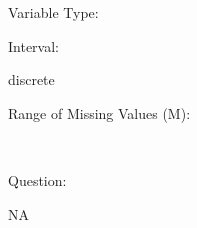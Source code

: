 \documentclass[
]{article}
\begin{document}
\begin{minipage}[t]{0.3\linewidth}

Variable Type:

\end{minipage}%
\begin{minipage}[t]{0.7\linewidth}

\end{minipage}

\begin{minipage}[t]{0.3\linewidth}

Interval:

\end{minipage}%
\begin{minipage}[t]{0.7\linewidth}

discrete

\end{minipage}

\begin{minipage}[t]{0.3\linewidth}

Range of Missing Values (M):

\end{minipage}%
\begin{minipage}[t]{0.7\linewidth}

~

\end{minipage}

\begin{minipage}[t]{0.3\linewidth}

Question:

\end{minipage}%
\begin{minipage}[t]{0.7\linewidth}

NA

\end{minipage}
\end{document}
